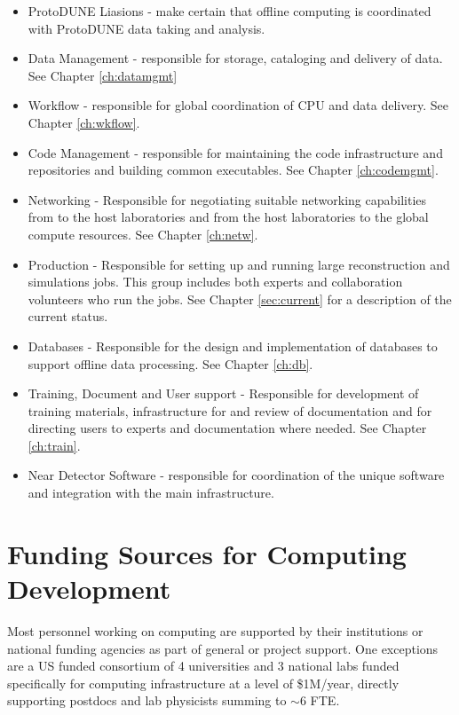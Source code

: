 \documentclass[../main-v1.tex]{subfiles}
\begin{document}
\begin{itemize} 
\item ProtoDUNE Liasions - make certain that offline computing is coordinated with ProtoDUNE data taking and analysis.

\item Data Management - responsible for storage, cataloging and delivery of data. See Chapter \ref{ch:datamgmt}

\item Workflow - responsible for global coordination of CPU and data delivery. See Chapter \ref{ch:wkflow}.


\item Code Management - responsible for maintaining the code infrastructure and  repositories and building common executables.  See Chapter \ref{ch:codemgmt}.

\item{Networking} -  Responsible for negotiating suitable networking capabilities from  to the host laboratories and from the host laboratories to the global compute resources.  See Chapter \ref{ch:netw}. 

\item{Production} - Responsible for setting up and running large reconstruction and simulations jobs. This group includes both experts and collaboration volunteers who run the jobs. See Chapter \ref{sec:current} for a description of the current status. 


\item{Databases} - Responsible for the design and implementation of databases to support offline data processing. See Chapter \ref{ch:db}.

\item{Training, Document and User support} - Responsible for development of training materials, infrastructure for and review of documentation and for directing users to experts and documentation where needed. See Chapter \ref{ch:train}.

\item Near Detector Software - responsible for coordination of the unique  software and integration with the main  infrastructure.

\end{itemize}

\section{Funding Sources for Computing Development}
Most personnel working on  computing are supported by their institutions or national funding agencies as part of general or  project support.  One exceptions are a US  funded consortium of 4 universities and 3 national labs funded specifically for  computing infrastructure at a level of \$1M/year, directly supporting postdocs and lab physicists summing to $\sim 6$ FTE.
\end{document}
